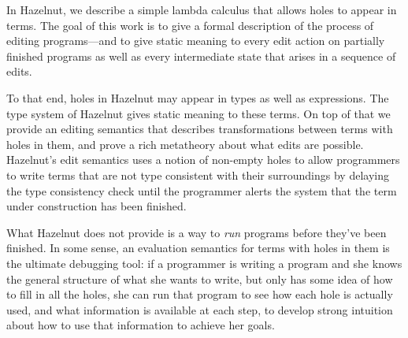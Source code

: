 In Hazelnut, we describe a simple lambda calculus that allows holes to
appear in terms. The goal of this work is to give a formal description of
the process of editing programs---and to give static meaning to every edit
action on partially finished programs as well as every intermediate state
that arises in a sequence of edits.

To that end, holes in Hazelnut may appear in types as well as
expressions. The type system of Hazelnut gives static meaning to these
terms. On top of that we provide an editing semantics that describes
transformations between terms with holes in them, and prove a rich
metatheory about what edits are possible. Hazelnut's edit semantics uses a
notion of non-empty holes to allow programmers to write terms that are not
type consistent with their surroundings by delaying the type consistency
check until the programmer alerts the system that the term under
construction has been finished.

What Hazelnut does not provide is a way to \emph{run} programs before
they've been finished. In some sense, an evaluation semantics for terms
with holes in them is the ultimate debugging tool: if a programmer is
writing a program and she knows the general structure of what she wants to
write, but only has some idea of how to fill in all the holes, she can run
that program to see how each hole is actually used, and what information is
available at each step, to develop strong intuition about how to use that
information to achieve her goals.
